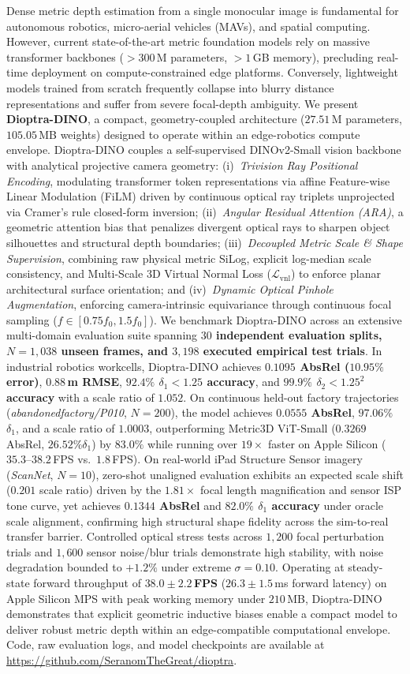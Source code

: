 Dense metric depth estimation from a single monocular image is fundamental for autonomous robotics, micro-aerial vehicles (MAVs), and spatial computing. However, current state-of-the-art metric foundation models rely on massive transformer backbones ($>300$\,M parameters, $>1$\,GB memory), precluding real-time deployment on compute-constrained edge platforms. Conversely, lightweight models trained from scratch frequently collapse into blurry distance representations and suffer from severe focal-depth ambiguity. We present \textbf{Dioptra-DINO}, a compact, geometry-coupled architecture ($27.51$\,M parameters, $105.05$\,MB weights) designed to operate within an edge-robotics compute envelope. Dioptra-DINO couples a self-supervised DINOv2-Small vision backbone with analytical projective camera geometry: (i)~\textit{Trivision Ray Positional Encoding}, modulating transformer token representations via affine Feature-wise Linear Modulation (FiLM) driven by continuous optical ray triplets unprojected via Cramer's rule closed-form inversion; (ii)~\textit{Angular Residual Attention (ARA)}, a geometric attention bias that penalizes divergent optical rays to sharpen object silhouettes and structural depth boundaries; (iii)~\textit{Decoupled Metric Scale \& Shape Supervision}, combining raw physical metric SiLog, explicit log-median scale consistency, and Multi-Scale 3D Virtual Normal Loss ($\mathcal{L}_{\text{vnl}}$) to enforce planar architectural surface orientation; and (iv)~\textit{Dynamic Optical Pinhole Augmentation}, enforcing camera-intrinsic equivariance through continuous focal sampling ($f \in [0.75f_0, 1.5f_0]$). We benchmark Dioptra-DINO across an extensive multi-domain evaluation suite spanning \textbf{$30$ independent evaluation splits, $N=1{,}038$ unseen frames, and $3{,}198$ executed empirical test trials}. In industrial robotics workcells, Dioptra-DINO achieves \textbf{$0.1095$ AbsRel ($10.95\%$ error)}, \textbf{$0.88$\,m RMSE}, \textbf{$92.4\%$ $\delta_1 < 1.25$ accuracy}, and \textbf{$99.9\%$ $\delta_2 < 1.25^2$ accuracy} with a scale ratio of \textbf{$1.052$}. On continuous held-out factory trajectories (\textit{abandonedfactory/P010}, $N=200$), the model achieves \textbf{$0.0555$ AbsRel}, \textbf{$97.06\%$ $\delta_1$}, and a scale ratio of \textbf{$1.0003$}, outperforming Metric3D ViT-Small ($0.3269$ AbsRel, $26.52\% \delta_1$) by $83.0\%$ while running over $19\times$ faster on Apple Silicon ($35.3\text{--}38.2$\,FPS vs.\ $1.8$\,FPS). On real-world iPad Structure Sensor imagery (\textit{ScanNet}, $N=10$), zero-shot unaligned evaluation exhibits an expected scale shift ($0.201$ scale ratio) driven by the $1.81\times$ focal length magnification and sensor ISP tone curve, yet achieves \textbf{$0.1344$ AbsRel} and \textbf{$82.0\%$ $\delta_1$ accuracy} under oracle scale alignment, confirming high structural shape fidelity across the sim-to-real transfer barrier. Controlled optical stress tests across $1{,}200$ focal perturbation trials and $1{,}600$ sensor noise/blur trials demonstrate high stability, with noise degradation bounded to $+1.2\%$ under extreme $\sigma=0.10$. Operating at steady-state forward throughput of \textbf{$38.0 \pm 2.2$\,FPS} ($26.3 \pm 1.5$\,ms forward latency) on Apple Silicon MPS with peak working memory under $210$\,MB, Dioptra-DINO demonstrates that explicit geometric inductive biases enable a compact model to deliver robust metric depth within an edge-compatible computational envelope. Code, raw evaluation logs, and model checkpoints are available at \url{https://github.com/SeranomTheGreat/dioptra}.

